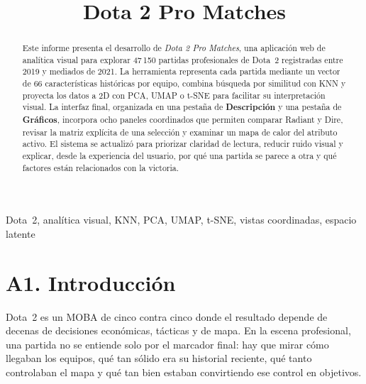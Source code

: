 \documentclass[conference]{IEEEtran}
\begin{document}
\title{Dota 2 Pro Matches}

\author{
}

\maketitle

\begin{abstract}
Este informe presenta el desarrollo de \textit{Dota 2 Pro Matches}, una
aplicación web de anal\'itica visual para explorar 47\,150 partidas
profesionales de Dota~2 registradas entre 2019 y mediados de 2021. La
herramienta representa cada partida mediante un vector de 66
caracter\'isticas hist\'oricas por equipo, combina b\'usqueda por
similitud con KNN y proyecta los datos a 2D con PCA, UMAP o t-SNE para
facilitar su interpretaci\'on visual. La interfaz final, organizada en
una pesta\~na de \textbf{Descripci\'on} y una pesta\~na de
\textbf{Gr\'aficos}, incorpora ocho paneles coordinados que permiten
comparar Radiant y Dire, revisar la matriz expl\'icita de una
selecci\'on y examinar un mapa de calor del atributo activo. El sistema
se actualiz\'o para priorizar claridad de lectura, reducir ruido
visual y explicar, desde la experiencia del usuario, por qu\'e una
partida se parece a otra y qu\'e factores est\'an relacionados con la
victoria.
\end{abstract}

\begin{IEEEkeywords}
Dota~2, anal\'itica visual, KNN, PCA, UMAP, t-SNE, vistas coordinadas,
espacio latente
\end{IEEEkeywords}

\section{A1. Introducci\'on}

Dota~2 es un MOBA de cinco contra cinco donde el resultado depende de
decenas de decisiones econ\'omicas, t\'acticas y de mapa. En la escena
profesional, una partida no se entiende solo por el marcador final: hay
que mirar c\'omo llegaban los equipos, qu\'e tan s\'olido era su
historial reciente, qu\'e tanto controlaban el mapa y qu\'e tan bien
estaban convirtiendo ese control en objetivos.
\end{document}
